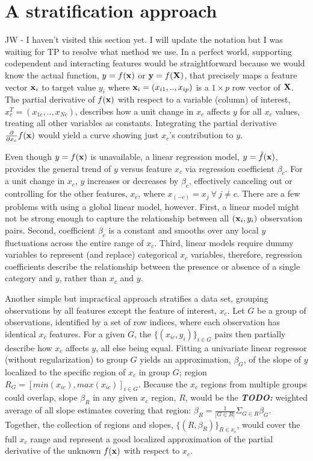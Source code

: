 \documentclass[12pt]{article}
\newcommand{\todo}[1]{{\bf\em TODO:} {{#1}}}
\newcommand{\xnc}{$x_{\overline{c}}$}
\begin{document}
\section{A stratification approach}
{\color{red} JW - I haven't visited this section yet. I will update the notation but I was waiting for TP to resolve what method we use.}
In a perfect world, supporting codependent and interacting features would be straightforward because we would know the actual function, $y = f({\bf x})$ or ${\bf y} = f(\bf X)$, that precisely maps a feature vector ${\bf x}_i$ to target value $y_i$ where ${\bf x}_i = ( x_{i1}, .., x_{ip} )$ is a $1 \times p$ row vector of $\bf X$. The partial derivative of $f({\bf x})$ with respect to a variable (column) of interest, $x_c^T = (x_{1c}, .., x_{Nc})$, describes how a unit change in $x_c$ affects $y$ for all $x_c$ values, treating all other variables as constants. Integrating the partial derivative $\frac{\partial}{\partial x_{c}} f({\bf x})$ would yield a curve showing just $x_{c}$'s contribution to $y$. 

Even though $y = f(\bf x)$ is unavailable, a linear regression model, $y = \hat{f}(\bf x)$, provides the general trend of $y$ versus feature $x_c$ via regression coefficient $\beta_c$. For a unit change in $x_c$, $y$ increases or decreases by $\beta_c$, effectively canceling out or controlling for the other features, \xnc, where $x_{(-c)} = x_{j} ~\forall~ j \neq c$. There are a few problems with using a global linear model, however.  First, a linear model might not be strong enough to capture the relationship between all $({\bf x}_i, y_i)$ observation pairs. Second, coefficient $\beta_c$ is a constant and smooths over any local $y$ fluctuations across the entire range of $x_c$. Third, linear models require dummy variables to represent (and replace) categorical $x_c$ variables, therefore, regression coefficients describe the relationship between the presence or absence of a single category and $y$, rather than $x_c$ and $y$.

Another simple but impractical approach stratifies a data set, grouping observations by all features except the feature of interest, $x_c$.  Let $G$ be a group of observations, identified by a set of row indices, where each observation has identical \xnc{} features. For a given $G$, the $\{(x_{ic},  y_i)\}_{i \in G}$ pairs then partially describe how $x_c$ affects $y$, all else being equal.  Fitting a univariate linear regressor (without regularization) to group $G$ yields an approximation, $\beta_G$, of the slope of $y$ localized to the specific region of $x_c$ in group $G$; region $R_G = [min(x_{ic}), max(x_{ic})]_{i \in G}$.   Because the $x_c$ regions from multiple groups could overlap, slope $\beta_R$ in any given $x_c$ region, $R$, would be the \todo{weighted}  average of all slope estimates covering that region: $\beta_R = \frac{1}{|G \in R|}\Sigma_{G \in R}\beta_G$. Together, the collection of regions and slopes, $\{(R, \beta_R)\}_{R \in x_c}$, would cover the full $x_c$ range and represent a good localized approximation of the partial derivative of the unknown $f(\bf x)$ with respect to $x_c$.
\end{document}
